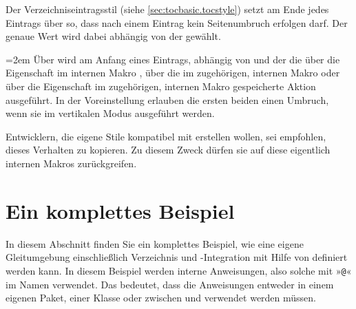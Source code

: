 \begin{Declaration}
\end{Declaration}
Der Verzeichniseintragsstil
 (siehe \autoref{sec:tocbasic.tocstyle}) setzt am Ende jedes
Eintrags über   so, dass
nach einem Eintrag kein Seitenumbruch erfolgen darf. Der genaue Wert wird
dabei abhängig von der  gewählt.

\begingroup
\emergencystretch=2em
Über  wird am Anfang eines
Eintrags, abhängig von  und der  die
über die Eigenschaft  im internen Makro
, über die
 im zugehörigen, internen
Makro\iffree{
}{\linebreak} oder
über die Eigenschaft  im zugehörigen, internen
Makro  gespeicherte
Aktion ausgeführt. In der Voreinstellung erlauben die
ersten beiden einen Umbruch, wenn sie im vertikalen Modus ausgeführt
werden.\par
\endgroup

Entwicklern, die eigene Stile kompatibel mit  erstellen
wollen, sei empfohlen, dieses Verhalten zu kopieren. Zu diesem Zweck dürfen
sie auf diese eigentlich internen Makros zurückgreifen.%
\EndIndexGroup


\section{Ein komplettes Beispiel}

In diesem Abschnitt finden Sie ein komplettes Beispiel, wie eine eigene
Gleitumgebung einschließlich Verzeichnis und \KOMAScript-Integration mit Hilfe
von  definiert werden kann. In diesem Beispiel werden
interne Anweisungen, also solche mit »\texttt{@}« im Namen
verwendet. Das  bedeutet, dass die Anweisungen entweder in
einem eigenen Paket, einer Klasse oder zwischen
%
 und 
verwendet werden müssen.

